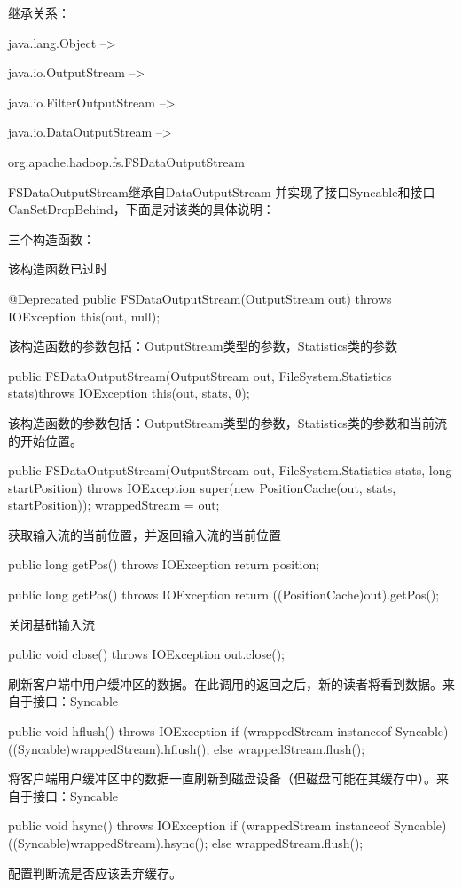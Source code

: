继承关系：

java.lang.Object -->

java.io.OutputStream -->

java.io.FilterOutputStream -->

java.io.DataOutputStream -->

org.apache.hadoop.fs.FSDataOutputStream



FSDataOutputStream继承自DataOutputStream 并实现了接口Syncable和接口CanSetDropBehind，下面是对该类的具体说明：

三个构造函数：

该构造函数已过时
\begin{java}
@Deprecated
public FSDataOutputStream(OutputStream out) throws IOException {
	this(out, null);
}
\end{java}
该构造函数的参数包括：OutputStream类型的参数，Statistics类的参数
\begin{java}
public FSDataOutputStream(OutputStream out, FileSystem.Statistics stats)throws IOException {
	this(out, stats, 0);
}
\end{java}
该构造函数的参数包括：OutputStream类型的参数，Statistics类的参数和当前流的开始位置。
\begin{java}
public FSDataOutputStream(OutputStream out, FileSystem.Statistics stats,
		     long startPosition) throws IOException {
	super(new PositionCache(out, stats, startPosition));
	wrappedStream = out;
}
\end{java}
获取输入流的当前位置，并返回输入流的当前位置
\begin{java}
public long getPos() throws IOException {
	return position;
}

public long getPos() throws IOException {
	return ((PositionCache)out).getPos();
}
\end{java}
关闭基础输入流
\begin{java}
public void close() throws IOException {
	out.close();
}
\end{java}
刷新客户端中用户缓冲区的数据。在此调用的返回之后，新的读者将看到数据。来自于接口：Syncable
\begin{java}
public void hflush() throws IOException {
	if (wrappedStream instanceof Syncable) {
		((Syncable)wrappedStream).hflush();
    	} else {
      		wrappedStream.flush();
    }
}
\end{java}
将客户端用户缓冲区中的数据一直刷新到磁盘设备（但磁盘可能在其缓存中）。来自于接口：Syncable

\begin{java}
public void hsync() throws IOException {
	if (wrappedStream instanceof Syncable) {
      ((Syncable)wrappedStream).hsync();
	    } else {
      		wrappedStream.flush();
	}
}
\end{java}
配置判断流是否应该丢弃缓存。

